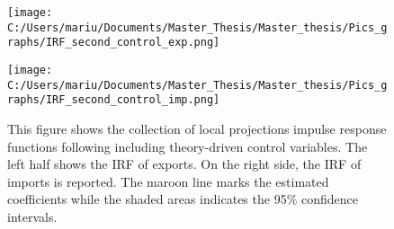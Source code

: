 \documentclass{article}
\begin{document}
\begin{figure}[!ht] 
\begin{center}
\begin{minipage}[t]{0.9\textwidth}
\begin{minipage}[t]{0.5\linewidth}\vspace{0pt} 
\texttt{[image: C:/Users/mariu/Documents/Master\_Thesis/Master\_thesis/Pics\_graphs/IRF\_second\_control\_exp.png]}\\
\end{minipage}\hfill%
\begin{minipage}[t]{0.5\linewidth}\vspace{0pt} 
\texttt{[image: C:/Users/mariu/Documents/Master\_Thesis/Master\_thesis/Pics\_graphs/IRF\_second\_control\_imp.png]}\\
\end{minipage}\hfill%
\caption{This figure shows the collection of local projections impulse response functions following \cite{jorda2005estimation} including theory-driven control variables. The left half shows the IRF of exports. On the right side, the IRF of imports is reported. The maroon line marks the estimated coefficients while the shaded areas indicates the 95\% confidence intervals.}
\label{Second Stage IRF - controls}
\end{minipage}
\end{center}
\end{figure}
\end{document}
